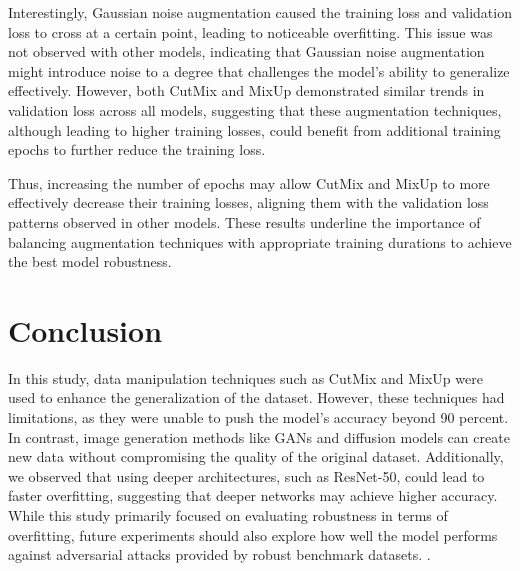\documentclass[12pt]{article}
\begin{document}
Interestingly, Gaussian noise augmentation caused the training loss and validation loss to cross at a certain point, leading to noticeable overfitting. This issue was not observed with other models, indicating that Gaussian noise augmentation might introduce noise to a degree that challenges the model's ability to generalize effectively. However, both CutMix and MixUp demonstrated similar trends in validation loss across all models, suggesting that these augmentation techniques, although leading to higher training losses, could benefit from additional training epochs to further reduce the training loss.

Thus, increasing the number of epochs may allow CutMix and MixUp to more effectively decrease their training losses, aligning them with the validation loss patterns observed in other models. These results underline the importance of balancing augmentation techniques with appropriate training durations to achieve the best model robustness.


\section{Conclusion}
In this study, data manipulation techniques such as CutMix and MixUp were used to enhance the generalization of the dataset. However, these techniques had limitations, as they were unable to push the model's accuracy beyond 90 percent. In contrast, image generation methods like GANs and diffusion models can create new data without compromising the quality of the original dataset. Additionally, we observed that using deeper architectures, such as ResNet-50, could lead to faster overfitting, suggesting that deeper networks may achieve higher accuracy. While this study primarily focused on evaluating robustness in terms of overfitting, future experiments should also explore how well the model performs against adversarial attacks provided by robust benchmark datasets.
\cite{robustbench}.




\end{document}
